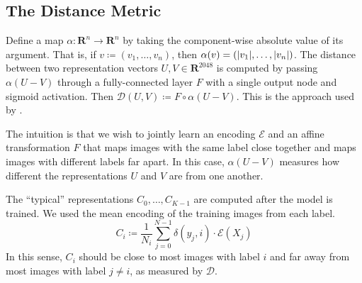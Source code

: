 \documentclass[12pt]{article}
\DeclarePairedDelimiter{\abs}{\lvert}{\rvert}
\begin{document}
\subsection{The Distance Metric} \label{subsec:the_distance_metric}

Define a map \(\alpha \colon \mathbf{R}^n \to \mathbf{R}^n\) by taking the component-wise absolute value of its argument. That is, if \(v \coloneqq (v_1, \dotsc, v_n)\), then \(\alpha(v) = (\abs{v_1}, \dotsc, \abs{v_n})\). The distance between two representation vectors \(U, V \in \mathbf{R}^{2048}\) is computed by passing \(\alpha(U - V)\) through a fully-connected layer \(F\) with a single output node and sigmoid activation. Then \(\mathcal{D}(U, V) \coloneqq F \circ \alpha(U - V)\). This is the approach used by \citet{cmu}.

The intuition is that we wish to jointly learn an encoding \(\mathcal{E}\) and an affine transformation \(F\) that maps images with the same label close together and maps images with different labels far apart. In this case, \(\alpha(U - V)\) measures how different the representations \(U\) and \(V\) are from one another.

The ``typical'' representations \(C_0, \dotsc, C_{K - 1}\) are computed after the model is trained. We used the mean encoding of the training images from each label.
\begin{equation}
    C_i \coloneqq \frac{1}{N_i} \sum_{j = 0}^{N - 1} \delta(y_j, i) \cdot \mathcal{E}(X_j) \label{eq:typical_rep}
\end{equation}
In this sense, \(C_i\) should be close to most images with label \(i\) and far away from most images with label \(j \neq i\), as measured by \(\mathcal{D}\).



\end{document}
